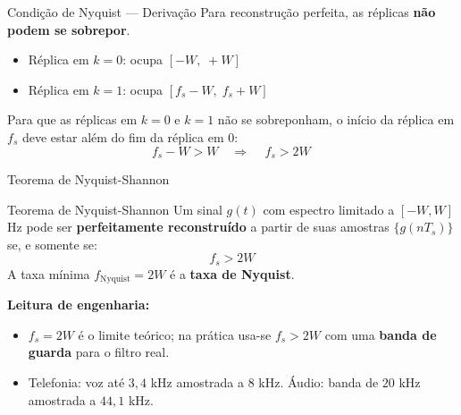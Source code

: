 
\begin{frame}{Condição de Nyquist — Derivação}
  Para reconstrução perfeita, as réplicas \textbf{não podem se sobrepor}.

  \vspace{0.5cm}
  \begin{itemize}
    \item Réplica em $k = 0$: ocupa $\left[-W,\;+W\right]$
    \item Réplica em $k = 1$: ocupa $\left[f_s - W,\;f_s + W\right]$
  \end{itemize}

  \vspace{0.5cm}
  Para que as réplicas em $k=0$ e $k=1$ não se sobreponham,
  o início da réplica em $f_s$ deve estar além do fim da réplica em $0$:
  \[
    f_s - W > W
    \quad\Longrightarrow\quad
    \boxed{\,f_s > 2W\,}
  \]
\end{frame}


\begin{frame}{Teorema de Nyquist-Shannon}
  \begin{block}{Teorema de Nyquist-Shannon}
    Um sinal $g(t)$ com espectro limitado a $[-W, W]$ Hz pode ser
    \textbf{perfeitamente reconstruído} a partir de suas amostras
    $\{g(nT_s)\}$ se, e somente se:
    \[
      f_s > 2W
    \]
    A taxa mínima $f_{\mathrm{Nyquist}} = 2W$ é a \textbf{taxa de Nyquist}.
  \end{block}

  \vspace{0.2cm}
  {\footnotesize
  \textbf{Leitura de engenharia:}
  \begin{itemize}
    \item $f_s = 2W$ é o limite teórico; na prática usa-se $f_s > 2W$
          com uma \textbf{banda de guarda} para o filtro real.
    \item Telefonia: voz até $3{,}4$ kHz amostrada a $8$ kHz.
          Áudio: banda de $20$ kHz amostrada a $44{,}1$ kHz.
  \end{itemize}}
\end{frame}


